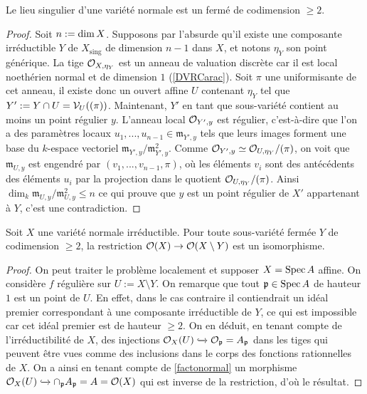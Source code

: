 \begin{prop}\label{codimesingnormal}
Le lieu singulier d'une variété normale est un fermé de codimension $\geq 2$.
\end{prop}
\begin{proof}
Soit $n:=\operatorname{dim} X$. Supposons par l'absurde qu'il existe une composante irréductible $Y$ de $X_{\text{sing}}$ de dimension $n-1$ dans $X$, et notons $\eta_Y$ son point générique. La tige $\mathcal{O}_{X,\eta_Y}$ est un anneau de valuation discrète car il est local noethérien normal et de dimension $1$ (\ref{DVRCarac}). Soit $\pi$ une uniformisante de cet anneau, il existe donc un ouvert affine $U$ contenant $\eta_Y$ tel que $Y':=Y\cap U=\mathcal{V}_U((\pi))$. Maintenant, $Y'$ en tant que sous-variété contient au moins un point régulier $y$. L'anneau local $\mathcal{O}_{Y',y}$ est régulier, c'est-à-dire que l'on a des paramètres locaux $u_1,...,u_{n-1}\in\mathfrak{m}_{Y',y}$ tels que leurs images forment une base du $k$-espace vectoriel $\mathfrak{m}_{Y',y}/\mathfrak{m}_{Y',y}^2$. Comme $\mathcal{O}_{Y',y}\simeq \mathcal{O}_{U,\eta_Y}/(\pi)$, on voit que $\mathfrak{m}_{U,y}$ est engendré par $(v_1,...,v_{n-1},\pi)$, où les éléments $v_i$ sont des antécédents des éléments $u_i$ par la projection dans le quotient $\mathcal{O}_{U,\eta_Y}/(\pi)$. Ainsi $\dim_k \mathfrak{m}_{U,y}/\mathfrak{m}_{U,y}^2\leq n$ ce qui prouve que $y$ est un point régulier de $X'$ appartenant à $Y$, c'est une contradiction.
\end{proof}


\begin{prop}\label{extregularnormal}
Soit $X$ une variété normale irréductible. Pour toute sous-variété fermée $Y$ de codimension $\geq 2$, la restriction $\mathcal{O}(X)\rightarrow \mathcal{O}(X\setminus Y)$ est un isomorphisme.
\end{prop}
\begin{proof}
On peut traiter le problème localement et supposer $X=\operatorname{Spec} A$ affine. On considère $f$ régulière sur $U:=X\setminus Y$. On remarque que tout $\mathfrak{p}\in \operatorname{Spec} A$ de hauteur $1$ est un point de $U$. En effet, dans le cas contraire il contiendrait un idéal premier correspondant à une composante irréductible de $Y$, ce qui est impossible car cet idéal premier est de hauteur $\geq 2$. On en déduit, en tenant compte de l'irréductibilité de $X$, des injections $\mathcal{O}_X(U)\xhookrightarrow{} \mathcal{O}_\mathfrak{p}=A_\mathfrak{p}$ dans les tiges qui peuvent être vues comme des inclusions dans le corps des fonctions rationnelles de $X$. On a ainsi en tenant compte de \ref{factonormal} un morphisme $\mathcal{O}_X(U)\xhookrightarrow{} \cap_\mathfrak{p} A_\mathfrak{p}=A=\mathcal{O}(X)$ qui est inverse de la restriction, d'où le résultat.
\end{proof}

